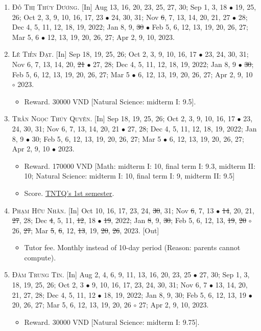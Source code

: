 \documentclass{article}
\begin{document}
\begin{enumerate}
	\item \textsc{Đỗ Thị Thùy Dương.} \textsf{[In]} Aug 13, 16, 20, 23, 25, 27, 30; Sep 1, 3, 18 $\bullet$ 19, 25, 26; Oct 2, 3, 9, 10, 16, 17, 23 $\bullet$ 24, 30, 31; Nov \st{6}, 7, 13, 14, 20, 21, 27 $\bullet$ 28; Dec 4, 5, 11, 12, 18, 19, 2022; Jan 8, 9, \st{30} $\bullet$ Feb 5, 6, 12, 13, 19, 20, 26, 27; Mar 5, 6 $\bullet$ 12, 13, 19, 20, 26, 27; Apr 2, 9, 10, 2023.
	\item \textsc{Lê Tiến Đạt.} \textsf{[In]} Sep 18, 19, 25, 26; Oct 2, 3, 9, 10, 16, 17 $\bullet$ 23, 24, 30, 31; Nov 6, 7, 13, 14, 20, \st{21} $\bullet$ 27, 28; Dec 4, 5, 11, 12, 18, 19, 2022; Jan 8, 9 $\bullet$ \st{30}; Feb 5, 6, 12, 13, 19, 20, 26, 27; Mar 5 $\bullet$ 6, 12, 13, 19, 20, 26, 27; Apr 2, 9, 10 $\circ$ 2023.
	\begin{itemize}
		\item \textsf{Reward.} 30000 VND [Natural Science: midterm I: 9.5].
	\end{itemize}
	\item \textsc{Trần Ngọc Thúy Quyên.} \textsf{[In]} Sep 18, 19, 25, 26; Oct 2, 3, 9, 10, 16, 17 $\bullet$ 23, 24, 30, 31; Nov 6, 7, 13, 14, 20, 21 $\bullet$ 27, 28; Dec 4, 5, 11, 12, 18, 19, 2022; Jan 8, 9 $\bullet$ 30; Feb 5, 6, 12, 13, 19, 20, 26, 27; Mar 5 $\bullet$ 6, 12, 13, 19, 20, 26, 27; Apr 2, 9, 10 $\bullet$ 2023.
	\begin{itemize}
		\item \textsf{Reward.} 170000 VND [Math: midterm I: 10, final term I: 9.3, midterm II: 10; Natural Science: midterm I: 10, final term I: 9, midterm II: 9.5]
		\item \textsf{Score.} \href{https://github.com/NQBH/hobby/blob/master/STEM/student/Tran_Ngoc_Thuy_Quyen_grade_7_1st_semester.jpg}{TNTQ's 1st semester}.
	\end{itemize}
	\item \textsc{Phạm Hữu Nhân.} \textsf{[In]} Oct 10, 16, 17, 23, 24, \st{30}, 31; Nov \st{6}, 7, 13 $\bullet$ \st{14}, 20, 21, \st{27}, 28; Dec \st{4}, 5, 11, \st{12}, 18 $\bullet$ \st{19}, 2022; Jan \st{8}, 9, \st{30}; Feb 5, 6, 12, 13, \st{19}, \st{20} $\circ$ 26, \st{27}; Mar \st{5}, \st{6}, 12, \st{13}, 19, \st{20}, \st{26}, 2023. \textsf{[Out]}
	\begin{itemize}
		\item \textsf{Tutor fee.} Monthly instead of 10-day period (Reason: parents cannot compute).
	\end{itemize}
	\item \textsc{Đàm Trung Tín.} \textsf{[In]} Aug 2, 4, 6, 9, 11, 13, 16, 20, 23, 25 $\bullet$ 27, 30; Sep 1, 3, 18, 19, 25, 26; Oct 2, 3 $\bullet$ 9, 10, 16, 17, 23, 24, 30, 31; Nov 6, 7 $\bullet$ 13, 14, 20, 21, 27, 28; Dec 4, 5, 11, 12 $\bullet$ 18, 19, 2022; Jan 8, 9, 30; Feb 5, 6, 12, 13, 19 $\bullet$ 20, 26, 27; Mar 5, 6, 12, 13, 19, 20, 26 $\circ$ 27; Apr 2, 9, 10, 2023.
	\begin{itemize}
		\item \textsf{Reward.} 30000 VND [Natural Science: midterm I: 9.75].
	\end{itemize}
\end{enumerate}
\end{document}
